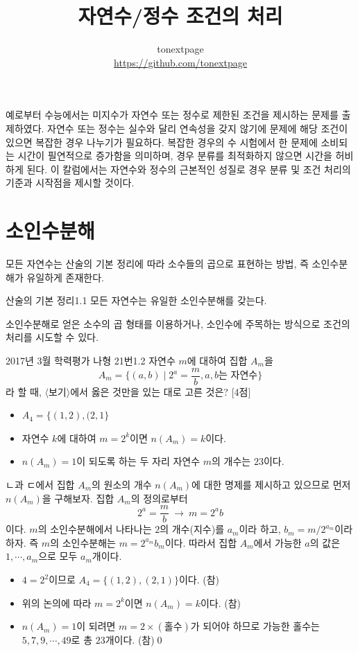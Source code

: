 \documentclass{article}
\title{자연수/정수 조건의 처리}
\author{tonextpage\\
    \url{https://github.com/tonextpage}
}
\date{}
\begin{document}
\maketitle

\noindent 예로부터 수능에서는 미지수가 자연수 또는 정수로 제한된 조건을 제시하는 문제를 출제하였다. 자연수 또는 정수는 실수와 달리 연속성을 갖지 않기에 문제에 해당 조건이 있으면 복잡한 경우 나누기가 필요하다. 복잡한 경우의 수 시험에서 한 문제에 소비되는 시간이 필연적으로 증가함을 의미하며, 경우 분류를 최적화하지 않으면 시간을 허비하게 된다. 이 칼럼에서는 자연수와 정수의 근본적인 성질로 경우 분류 및 조건 처리의 기준과 시작점을 제시할 것이다.

\section{소인수분해}
모든 자연수는 산술의 기본 정리에 따라 소수들의 곱으로 표현하는 방법, 즉 소인수분해가 유일하게 존재한다.

\begin{thm}{산술의 기본 정리}{1.1}
	모든 자연수는 유일한 소인수분해를 갖는다.
\end{thm}

소인수분해로 얻은 소수의 곱 형태를 이용하거나, 소인수에 주목하는 방식으로 조건의 처리를 시도할 수 있다.

\begin{exc}{2017년 3월 학력평가 나형 21번}{1.2}
	자연수 $m$에 대하여 집합 $A_m$을
	\[
		A_m=\biggl\{(a,b)\mid 2^a=\frac{m}{b},a,b\text{는 자연수}\biggr\}
	\]
	라 할 때, $\langle$보기$\rangle$에서 옳은 것만을 있는 대로 고른 것은? [4점]
	\begin{hint}[보기]
		\begin{itemize}
			\item[ㄱ.] $A_4=\{(1,2),(2,1\}$
			\item[ㄴ.] 자연수 $k$에 대하여 $m=2^k$이면 $n(A_m)=k$이다.
			\item[ㄷ.] $n(A_m)=1$이 되도록 하는 두 자리 자연수 $m$의 개수는 $23$이다.
		\end{itemize}
	\end{hint}
\end{exc}

\begin{sol}
	ㄴ과 ㄷ에서 집합 $A_m$의 원소의 개수 $n(A_m)$에 대한 명제를 제시하고 있으므로 먼저 $n(A_m)$을 구해보자. 집합 $A_m$의 정의로부터
	\[
		2^a=\frac{m}{b}~\longrightarrow~m=2^ab
	\]
	이다. $m$의 소인수분해에서 나타나는 $2$의 개수(지수)를 $a_m$이라 하고, $b_m=m/2^{a_m}$이라 하자. 즉 $m$의 소인수분해는 $m=2^{a_m}b_m$이다. 따라서 집합 $A_m$에서 가능한 $a$의 값은 $1,\cdots,a_m$으로 모두 $a_m$개이다.
	\begin{itemize}
		\item[ㄱ.] $4=2^2$이므로 $A_4=\{(1,2),(2,1)\}$이다. (참)
		\item[ㄴ.] 위의 논의에 따라 $m=2^k$이면 $n(A_m)=k$이다. (참)
		\item[ㄷ.] $n(A_m)=1$이 되려면 $m=2\times(\text{홀수})$가 되어야 하므로 가능한 홀수는 $5,7,9,\cdots,49$로 총 $23$개이다. (참)\qed
	\end{itemize}
\end{sol}
\end{document}
